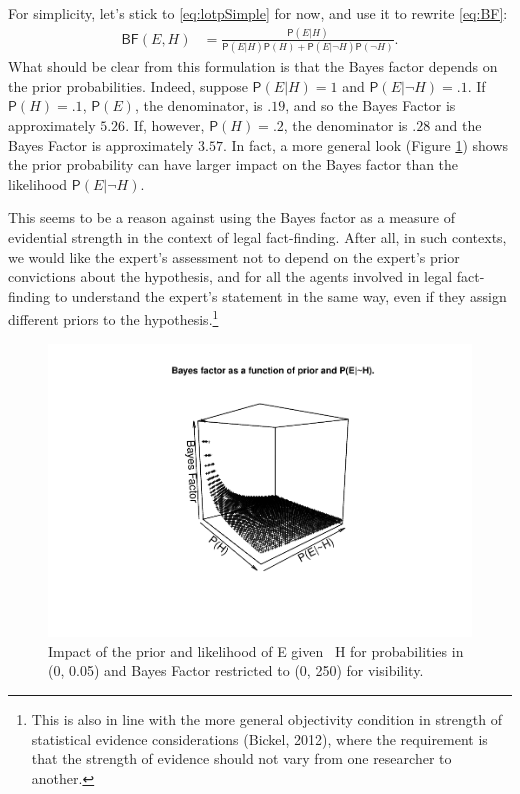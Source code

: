\documentclass[
  10pt,
  dvipsnames,enabledeprecatedfontcommands]{scrartcl}
\newcommand{\n}{\neg}
\newcommand{\pr}[1]{\mathsf{P}(#1)}
\begin{document}
\noindent For simplicity, let's stick to \eqref{eq:lotpSimple} for now,
and use it to rewrite \eqref{eq:BF}: \begin{align}\label{eq:BFlotp}
\mathsf{BF}(E,H) & = \frac{\pr{E \vert H}}{\pr{E \vert H} \pr{H}+\pr{E \vert \neg H} \pr{\neg H}}.
\end{align} \noindent What should be clear from this formulation is that
the Bayes factor depends on the prior probabilities. Indeed, suppose
\(\pr{E \vert H} = 1\) and \(\pr{E \vert \neg H} = .1\). If
\(\pr{H}=.1\), \(\pr{E}\), the denominator, is \(.19\), and so the Bayes
Factor is approximately \(5.26\). If, however, \(\pr{H} =.2\), the
denominator is \(.28\) and the Bayes Factor is approximately \(3.57\).
In fact, a more general look (Figure \ref{fig:BayesFactorPrior}) shows
the prior probability can have larger impact on the Bayes factor than
the likelihood \(\pr{E \vert \n H}\).

This seems to be a reason against using the Bayes factor as a measure of
evidential strength in the context of legal fact-finding. After all, in
such contexts, we would like the expert's assessment not to depend on
the expert's prior convictions about the hypothesis, and for all the
agents involved in legal fact-finding to understand the expert's
statement in the same way, even if they assign different priors to the
hypothesis.\footnote{This is also in line with the more general
  objectivity condition in strength of statistical evidence
  considerations (Bickel, 2012), where the requirement is that the
  strength of evidence should not vary from one researcher to another.}

\footnotesize

\normalsize

\begin{figure}


\begin{center}\includegraphics[width=1\linewidth]{lr-chapter3_files/figure-latex/fig-BayesFactorPrior-1} \end{center}
\caption{Impact of the prior and likelihood of E given ~H for probabilities in (0, 0.05) and Bayes Factor restricted to (0, 250) for visibility.}
\label{fig:BayesFactorPrior}
\end{figure}
\end{document}
